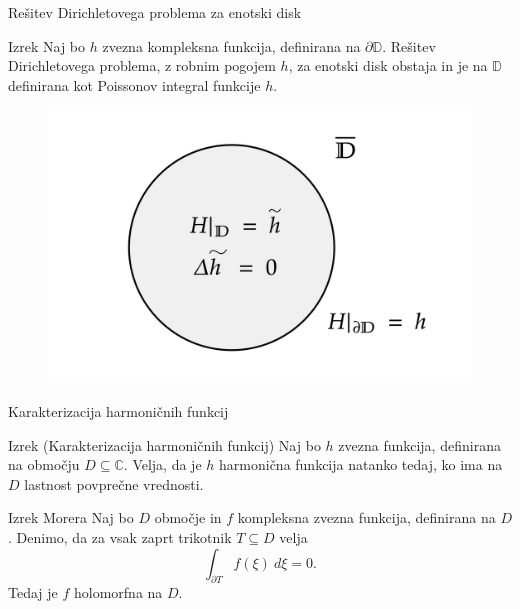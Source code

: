\documentclass{beamer}
\theoremstyle{definition}
\theoremstyle{definition}
\begin{document}
\begin{frame}{Rešitev Dirichletovega problema za enotski disk}
    \begin{alertblock}{Izrek}
        Naj bo $h$ zvezna kompleksna funkcija, definirana na $\partial \mathbb{D}$. Rešitev Dirichletovega problema, z robnim pogojem $h$, za enotski disk obstaja in je na $\mathbb{D}$ definirana kot Poissonov integral funkcije $h$.
    \end{alertblock}
    \begin{figure}
    \begin{center}
      \includegraphics[width=0.8 \textwidth]{dirichlet_resitev.png}
    \end{center}
    \end{figure}
\end{frame}

\begin{frame}{Karakterizacija harmoničnih funkcij}
    \begin{alertblock}{Izrek (Karakterizacija harmoničnih funkcij)}
        Naj bo $h$ zvezna funkcija, definirana na območju $D \subseteq \mathbb{C}$. Velja, da je $h$ harmonična funkcija natanko tedaj, ko ima na $D$ lastnost povprečne vrednosti.
    \end{alertblock}
    \pause
    \begin{alertblock}{Izrek Morera}
        Naj bo $D$ območje in $f$ kompleksna zvezna funkcija, definirana na $D$. 
        Denimo, da za vsak zaprt trikotnik $T \subseteq D$ velja 
        $$
        \int_{\partial T} {f(\xi)~d\xi} = 0.
        $$
        Tedaj je $f$ holomorfna na $D$.
    \end{alertblock}
\end{frame}
\end{document}
